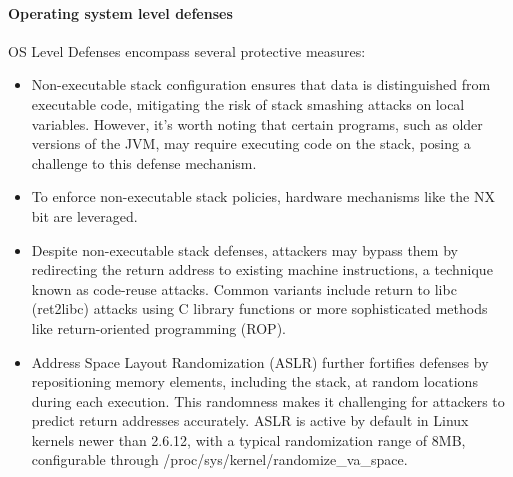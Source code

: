\paragraph*{Operating system level defenses}
OS Level Defenses encompass several protective measures:
\begin{itemize}
    \item Non-executable stack configuration ensures that data is distinguished from executable code, mitigating the risk of stack smashing attacks on local variables. 
        However, it's worth noting that certain programs, such as older versions of the JVM, may require executing code on the stack, posing a challenge to this defense mechanism.
    \item To enforce non-executable stack policies, hardware mechanisms like the NX bit are leveraged. 
    \item Despite non-executable stack defenses, attackers may bypass them by redirecting the return address to existing machine instructions, a technique known as code-reuse attacks. 
        Common variants include return to libc (ret2libc) attacks using C library functions or more sophisticated methods like return-oriented programming (ROP).
    \item Address Space Layout Randomization (ASLR) further fortifies defenses by repositioning memory elements, including the stack, at random locations during each execution.
        This randomness makes it challenging for attackers to predict return addresses accurately. 
        ASLR is active by default in Linux kernels newer than 2.6.12, with a typical randomization range of 8MB, configurable through /proc/sys/kernel/randomize\_va\_space.
\end{itemize}